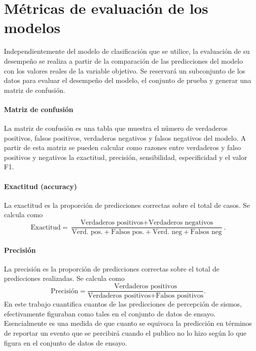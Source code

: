 \documentclass[a4paper]{report}
\begin{document}


\section{Métricas de evaluación de los modelos}\label{sec:métricas}

Independientemente del modelo de clasificación que se utilice, la evaluación de su desempeño se realiza a partir de la comparación de las predicciones del modelo con los valores reales de la variable objetivo.
Se reservará un subconjunto de los datos para evaluar el desempeño del modelo, el conjunto de prueba y generar una matriz de confusión.


\paragraph{Matriz de confusión}
La matriz de confusión es una tabla que muestra el número de verdaderos positivos, falsos positivos, verdaderos negativos y falsos negativos del modelo.
A partir de esta matriz se pueden calcular como razones entre verdaderos y falso positivos y negativos la exactitud, precisión, sensibilidad, especificidad y el valor F1.


\paragraph{Exactitud (accuracy)}
La exactitud es la proporción de predicciones correctas sobre el total de casos.
Se calcula como
\begin{equation}
	\text{Exactitud} = \frac{\text{Verdaderos positivos} + \text{Verdaderos negativos}}{\text{Verd. pos.} + \text{Falsos pos.} + \text{Verd. neg} + \text{Falsos neg}}.
\end{equation}


\paragraph{Precisión}
La precisión es la proporción de predicciones correctas sobre el total de predicciones realizadas.
Se calcula como
\begin{equation}
	\text{Precisión} = \frac{\text{Verdaderos positivos}}{\text{Verdaderos positivos} + \text{Falsos positivos}}.
\end{equation}
En este trabajo cuantifica cuantos de las predicciones de percepción de sismos, efectivamente figuraban como tales en el conjunto de datos de ensayo.
Esencialmente es una medida de que cuanto se equivoca la predicción en términos de reportar un evento que se percibirá cuando el publico no lo hizo según lo que figura en el conjunto de datos de ensayo.
\end{document}
